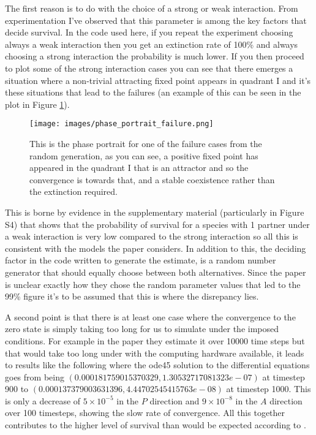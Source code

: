 \documentclass[11pt]{scrreprt}
\begin{document}
\begin{enumerate}
		The first reason is to do with the choice of a strong or weak interaction. From experimentation I've observed that this parameter is among the key factors that decide survival. In the code used here, if you repeat the experiment choosing always a weak interaction then you get an extinction rate of 100\% and always choosing a strong interaction the probability is much lower. If you then proceed to plot some of the strong interaction cases you can see that there emerges a situation where a non-trivial attracting fixed point appears in quadrant I and it's these situations that lead to the failures (an example of this can be seen in the plot in Figure \ref{fig:phase_plot}).
		
		\begin{figure}[ht]
			\begin{center}
				\texttt{[image: images/phase\_portrait\_failure.png]}
			\end{center}
			\caption{This is the phase portrait for one of the failure cases from the random generation, as you can see, a positive fixed point has appeared in the quadrant I that is an attractor and so the convergence is towards that, and a stable coexistence rather than the extinction required.}
			\label{fig:phase_plot}
		\end{figure}
		
		
		This is borne by evidence in the supplementary material (particularly in Figure S4) that shows that the probability of survival for a species with 1 partner under a weak interaction is very low compared to the strong interaction so all this is consistent with the models the paper considers. In addition to this, the deciding factor in the code written to generate the estimate, is a random number generator that should equally choose between both alternatives. Since the paper is unclear exactly how they chose the random parameter values that led to the 99\% figure it's to be assumed that this is where the disrepancy lies. 
		
		A second point is that there is at least one case where the convergence to the zero state is simply taking too long for us to simulate under the imposed conditions. For example in the paper they estimate it over 10000 time steps but that would take too long under with the computing hardware available, it leads to results like the following where the ode45 solution to the differential equations goes from being $(0.000181759015370329,	1.30532717081323e-07)$ at timestep 900 to $(0.000137379003631396,	4.44702545415763e-08)$ at timestep 1000. This is only a decrease of $5 \times 10^{-5}$ in the $P$ direction and $9 \times 10^{-8}$ in the $A$ direction over 100 timesteps, showing the slow rate of convergence. All this together contributes to the higher level of survival than would be expected according to \citet{James2012}.
		

\end{enumerate}
\end{document}
